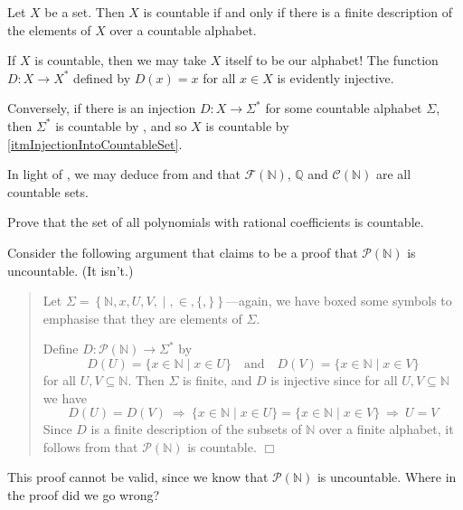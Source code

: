 \begin{theorem}
\label{thmCountableIffFiniteDescription}
Let $X$ be a set. Then $X$ is countable if and only if there is a finite description of the elements of $X$ over a countable alphabet.
\end{theorem}

\begin{cproof}
If $X$ is countable, then we may take $X$ itself to be our alphabet! The function $D : X \to X^*$ defined by $D(x) = x$ for all $x \in X$ is evidently injective.

Conversely, if there is an injection $D : X \to \Sigma^*$ for some countable alphabet $\Sigma$, then $\Sigma^*$ is countable by , and so $X$ is countable by \ref{itmInjectionIntoCountableSet}.
\end{cproof}

\begin{example}
In light of , we may deduce from  and  that $\mathcal{F}(\mathbb{N})$, $\mathbb{Q}$ and $\mathcal{C}(\mathbb{N})$ are all countable sets.
\end{example}

\begin{exercise}
Prove that the set of all polynomials with rational coefficients is countable.
\end{exercise}

\begin{exercise}
Consider the following argument that claims to be a proof that $\mathcal{P}(\mathbb{N})$ is uncountable. (It isn't.)
\begin{quote}
Let $\Sigma = \left\{ \mathbb{N},x,U,V,\boxed{\mid},\boxed{\in},\boxed{\{},\boxed{\}} \right\}$---again, we have boxed some symbols to emphasise that they are elements of $\Sigma$.

Define $D : \mathcal{P}(\mathbb{N}) \to \Sigma^*$ by
\[ D(U) = \{ x \in \mathbb{N} \mid x \in U \} \quad \text{and} \quad D(V) = \{ x \in \mathbb{N} \mid x \in V \} \]
for all $U, V \subseteq \mathbb{N}$. Then $\Sigma$ is finite, and $D$ is injective since for all $U,V \subseteq \mathbb{N}$ we have
\[ D(U) = D(V) ~ \Rightarrow ~ \{ x \in \mathbb{N} \mid x \in U \} = \{ x \in \mathbb{N} \mid x \in V \} ~ \Rightarrow ~ U = V \]
Since $D$ is a finite description of the subsets of $\mathbb{N}$ over a finite alphabet, it follows from  that $\mathcal{P}(\mathbb{N})$ is countable. \hfill $\Box$
\end{quote}
This proof cannot be valid, since we know that $\mathcal{P}(\mathbb{N})$ is uncountable. Where in the proof did we go wrong?
\end{exercise}


